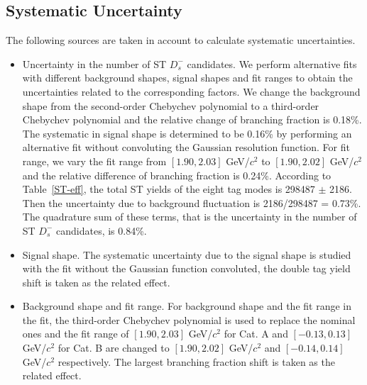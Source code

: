 \documentclass[aps,prd,twocolumn,showpacs,amsmath,amssymb]{revtex4-1}
\begin{document}
\subsection{Systematic Uncertainty}
The following sources are taken in account to calculate systematic uncertainties.

\begin{itemize}
    \item Uncertainty in the number of ST $D_{s}^{-}$ candidates. We perform alternative fits with different background shapes, signal shapes and fit ranges to obtain the uncertainties related to the corresponding factors.
        We change the background shape from the second-order Chebychev polynomial to a third-order Chebychev polynomial and the relative change of branching fraction is 0.18\%.
        The systematic in signal shape is determined to be 0.16\% by performing an alternative fit without convoluting the Gaussian resolution function.
        For fit range, we vary the fit range from $[1.90, 2.03]$ GeV/$c^{2}$ to $[1.90, 2.02]$ GeV/$c^{2}$ and the relative difference of branching fraction is 0.24\%.
        According to Table~\ref{ST-eff}, the total ST yields of the eight tag modes is  298487 $\pm$ 2186. Then the uncertainty due to background fluctuation is 2186/298487 = 0.73\%.
        The quadrature sum of these terms, that is the uncertainty in the number of ST $D_{s}^{-}$ candidates, is 0.84\%. 

    \item Signal shape. The systematic uncertainty due to the signal shape is studied with the fit without the Gaussian function convoluted, the double tag yield shift is taken as the related effect. 

    \item Background shape and fit range. For background shape and the fit range in the fit, the third-order Chebychev polynomial is used to replace the nominal ones and the fit  range of $[1.90, 2.03]$ GeV/$c^{2}$ for Cat. A and $[-0.13, 0.13]$ GeV/$c^{2}$ for Cat. B are changed to $[1.90, 2.02]$ GeV/$c^{2}$ and $[-0.14, 0.14]$ GeV/$c^{2}$ respectively. 
        The largest branching fraction shift is taken as the related effect.


\end{itemize}
\end{document}
